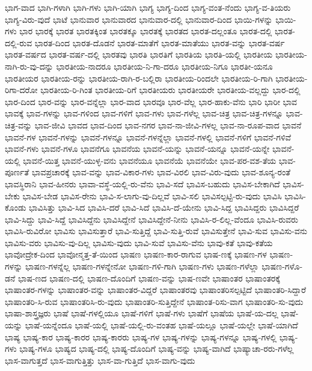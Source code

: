{ಭಾಗ-ವಾದ
ಭಾಗಿ-ಗಳಾಗಿ
ಭಾಗಿ-ಗಳು
ಭಾಗಿ-ಯಾಗಿ
ಭಾಗ್ಯ
ಭಾಗ್ಯ-ದಿಂದ
ಭಾಗ್ಯ-ವಂತ-ನೆಂದು
ಭಾಗ್ಯ-ವ-ತಿಯರು
ಭಾಗ್ಯ-ವಿರು-ವುದೆ
ಭಾಟೆ
ಭಾನುವಾರ
ಭಾನುವಾರದ
ಭಾನುವಾರ-ದಲ್ಲಿ
ಭಾನುವಾರ-ದಿಂದ
ಭಾಯಿ-ಗಳನ್ನು
ಭಾಯಿ-ಗಳು
ಭಾರ
ಭಾರಕ್ಕೆ
ಭಾರತ
ಭಾರತಕ್ಕಿಂತ
ಭಾರತಕ್ಕೂ
ಭಾರತಕ್ಕೆ
ಭಾರತದ
ಭಾರತ-ದಲ್ಲಂತೂ
ಭಾರತ-ದಲ್ಲಿ
ಭಾರತ-ದಲ್ಲಿ-ರುವ
ಭಾರತ-ದಿಂದ
ಭಾರತ-ದೊಡನೆ
ಭಾರತ-ಮಾತೆಗೆ
ಭಾರತ-ಮಾತೆಯು
ಭಾರತ-ವನ್ನು
ಭಾರತ-ವರ್ಷ
ಭಾರತ-ವರ್ಷದ
ಭಾರತ-ವರ್ಷ-ದಲ್ಲಿ
ಭಾರತವು
ಭಾರತಿ
ಭಾರತಿಗೆ
ಭಾರತಿಯ
ಭಾರತಿ-ಯಲ್ಲಿ
ಭಾರತೀಯ
ಭಾರತೀಯ-ನಾಗಿ-ರು-ವು-ದನ್ನು
ಭಾರತೀಯ-ನಾದರೂ
ಭಾರತೀಯ-ನಿ-ಗಾ-ದರೂ
ಭಾರತೀಯ-ನಿಗೂ
ಭಾರತೀ-ಯನೂ
ಭಾರತೀಯರ
ಭಾರತೀಯ-ರನ್ನು
ಭಾರತೀಯ-ರಾಗಿ-ರ-ಬಲ್ಲಿರಾ
ಭಾರತೀಯ-ರಿಂದಲೇ
ಭಾರತೀಯ-ರಿ-ಗಾಗಿ
ಭಾರತೀಯ-ರಿಗಾ-ದರೋ
ಭಾರತೀಯ-ರಿ-ಗಿಂತ
ಭಾರತೀಯ-ರಿಗೆ
ಭಾರತೀಯರು
ಭಾರತೀಯರೇ
ಭಾರತೀಯ-ವಲ್ಲದ್ದು
ಭಾರ-ದಲ್ಲಿ
ಭಾರ-ದಿಂದ
ಭಾರ-ವನ್ನು
ಭಾರ-ವನ್ನೆಲ್ಲಾ
ಭಾರ-ವಾದ
ಭಾರವೂ
ಭಾರ-ವೆಲ್ಲ
ಭಾರ-ಹಾಕು-ವೆನು
ಭಾರಿ
ಭಾರೀ
ಭಾವ
ಭಾವಕ್ಕೆ
ಭಾವ-ಗಳನ್ನು
ಭಾವ-ಗಳಿಂದ
ಭಾವ-ಗಳಿಗೆ
ಭಾವ-ಗಳು
ಭಾವ-ಗಳೆಲ್ಲ
ಭಾವ-ಚಿತ್ರ
ಭಾವ-ಚಿತ್ರ-ಗಳನ್ನೂ
ಭಾವ-ಚಿತ್ರ-ವನ್ನು
ಭಾವ-ಜೀವಿ
ಭಾವದ
ಭಾವ-ದಿಂದ
ಭಾವ-ನಗರ
ಭಾವ-ನಾ-ಜೀವಿ-ಗಳಲ್ಲ
ಭಾವ-ನಾ-ರೂಪ-ವಾದ
ಭಾವನೆ
ಭಾವನೆ-ಗಳ
ಭಾವನೆ-ಗಳನ್ನು
ಭಾವನೆ-ಗಳನ್ನೂ
ಭಾವನೆ-ಗಳನ್ನೆಲ್ಲಾ
ಭಾವನೆ-ಗಳಲ್ಲಿ
ಭಾವನೆ-ಗಳಿಗೆ
ಭಾವನೆ-ಗಳಿವೆ
ಭಾವನೆ-ಗಳು
ಭಾವನೆ-ಗಳೂ
ಭಾವನೆಗೂ
ಭಾವನೆಯ
ಭಾವನೆ-ಯನ್ನು
ಭಾವನೆ-ಯನ್ನೂ
ಭಾವನೆ-ಯನ್ನೇ
ಭಾವನೆ-ಯಲ್ಲಿ
ಭಾವನೆ-ಯಿತ್ತ
ಭಾವನೆ-ಯುಳ್ಳ-ವನು
ಭಾವನೆಯೂ
ಭಾವನೆಯೆ
ಭಾವನೆಯೇ
ಭಾವ-ಪರ-ವಶ-ತೆಯ
ಭಾವ-ಪೂರ್ಣತೆ
ಭಾವಪ್ರಚಾರಕ್ಕೆ
ಭಾವ-ವನ್ನು
ಭಾವ-ವಿಕಾರ-ಗಳು
ಭಾವ-ವಿರಲಿ
ಭಾವ-ವಿರು-ವುದು
ಭಾವ-ಶೂನ್ಯ-ರಂತೆ
ಭಾವಸ್ಥಿರಾನಿ
ಭಾವ-ಹೀನರು
ಭಾವಾ-ವಸ್ಥೆ-ಯಲ್ಲಿ-ರು-ವೆನು
ಭಾವಿ-ಸದೆ
ಭಾವಿಸ-ಬಹುದು
ಭಾವಿಸ-ಬೇಕಾಗಿದೆ
ಭಾವಿಸ-ಬೇಕು
ಭಾವಿಸ-ಬೇಡ
ಭಾವಿಸ-ರೇನು
ಭಾವಿ-ಸ-ಲಾಗು-ವು-ದಿಲ್ಲವೆ
ಭಾವಿ-ಸಲಿ
ಭಾವಿಸಲ್ಪಟ್ಟಿ-ರು-ವುದು
ಭಾವಿಸಿ
ಭಾವಿಸಿ-ಕೊಂಡು
ಭಾವಿಸಿತ್ತು
ಭಾವಿ-ಸಿದ
ಭಾವಿಸಿ-ದರೆ
ಭಾವಿ-ಸಿದೆ
ಭಾವಿಸಿ-ದೆ-ಯೇನು
ಭಾವಿ-ಸಿದ್ದ
ಭಾವಿಸಿದ್ದರು
ಭಾವಿಸಿದ್ದರೆ
ಭಾವಿ-ಸಿದ್ದು
ಭಾವಿ-ಸಿದ್ದೆ
ಭಾವಿಸಿದ್ದೆನು
ಭಾವಿಸಿದ್ದೇನೆ
ಭಾವಿಸಿದ್ದೇನೆ-ನೀನು
ಭಾವಿಸಿ-ರ-ಲಿಲ್ಲ-ವೆಂದೂ
ಭಾವಿಸಿ-ರುವರು
ಭಾವಿಸಿ-ರುವಿರೋ
ಭಾವಿಸು
ಭಾವಿಸುತ್ತಾರೆ
ಭಾವಿ-ಸುತ್ತಿದ್ದೆ
ಭಾವಿ-ಸುತ್ತಿ-ರುವೆ
ಭಾವಿಸುತ್ತೇನೆ
ಭಾವಿ-ಸುವ
ಭಾವಿಸು-ವನು
ಭಾವಿಸು-ವರು
ಭಾವಿಸು-ವು-ದಿಲ್ಲ
ಭಾವಿಸು-ವುದು
ಭಾವಿ-ಸುವೆ
ಭಾವಿಸು-ವೆನು
ಭಾವು-ಕತೆ
ಭಾವು-ಕತೆಯ
ಭಾವೋದ್ರೇಕ-ದಿಂದ
ಭಾವೋನ್ಮತ್ತ-ತೆ-ಯಿಂದ
ಭಾಷಣ
ಭಾಷಣ-ಕಾರ-ರಾಗುವ
ಭಾಷ-ಣಕ್ಕೆ
ಭಾಷಣ-ಗಳ
ಭಾಷಣ-ಗಳನ್ನು
ಭಾಷಣ-ಗಳನ್ನೆಲ್ಲ
ಭಾಷಣ-ಗಳನ್ನೇನೋ
ಭಾಷಣ-ಗಳಿ-ಗಾಗಿ
ಭಾಷಣ-ಗಳು
ಭಾಷಣ-ಗಳೆಲ್ಲಾ
ಭಾಷಣ-ಗಳೊ-ಡನೆ
ಭಾಷ-ಣದ
ಭಾಷಣ-ದಲ್ಲಿ
ಭಾಷಣ-ದೊಂದಿಗೆ
ಭಾಷಣ-ವನ್ನು
ಭಾಷ-ಣವೇ
ಭಾಷಾಂತರ
ಭಾಷಾಂತರಕ್ಕೆ
ಭಾಷಾಂತರ-ಗಳನ್ನು
ಭಾಷಾಂತರ-ವನ್ನು
ಭಾಷಾಂತರ-ವಿದ್ದರೆ
ಭಾಷಾಂತರವು
ಭಾಷಾಂತರಿಸಲ್ಪಟ್ಟಿದೆ
ಭಾಷಾಂತರಿ-ಸಿದ್ದಾರೆ
ಭಾಷಾಂತರಿ-ಸಿ-ರುವ
ಭಾಷಾಂತರಿಸಿ-ರು-ವುದು
ಭಾಷಾಂತರಿ-ಸುತ್ತಿದ್ದೇನೆ
ಭಾಷಾಂತ-ರಿಸು-ವಾಗ
ಭಾಷಾಂತರಿ-ಸು-ವುದು
ಭಾಷಾ-ಶಾಸ್ತ್ರಜ್ಞರು
ಭಾಷೆ
ಭಾಷೆ-ಗಳಲ್ಲಿಯೂ
ಭಾಷೆ-ಗಳಿಗೆ
ಭಾಷೆ-ಗಳು
ಭಾಷೆಗೆ
ಭಾಷೆಯ
ಭಾಷೆ-ಯ-ದಲ್ಲ
ಭಾಷೆ-ಯನ್ನು
ಭಾಷೆ-ಯನ್ನೆಂದೂ
ಭಾಷೆ-ಯಲ್ಲಿ
ಭಾಷೆ-ಯಲ್ಲಿ-ರು-ವಂತಹ
ಭಾಷೆ-ಯಲ್ಲೂ
ಭಾಷೆ-ಯಲ್ಲೇ
ಭಾಷೆ-ಯಾಗಿದೆ
ಭಾಷ್ಯ
ಭಾಷ್ಯ-ಕಾರ
ಭಾಷ್ಯ-ಕಾರರ
ಭಾಷ್ಯ-ಕಾರರು
ಭಾಷ್ಯ-ಗಳ
ಭಾಷ್ಯ-ಗಳನ್ನು
ಭಾಷ್ಯ-ಗಳನ್ನೂ
ಭಾಷ್ಯ-ಗಳಲ್ಲಿ
ಭಾಷ್ಯ-ಗಳು
ಭಾಷ್ಯ-ಗಳೂ
ಭಾಷ್ಯದ
ಭಾಷ್ಯ-ದಲ್ಲಿ
ಭಾಷ್ಯ-ದೊಂದಿಗೆ
ಭಾಷ್ಯ-ವನ್ನು
ಭಾಷ್ಯ-ವಾಗಿದೆ
ಭಾಷ್ಯಾಚಾ-ರರು-ಗಳೆಲ್ಲ
ಭಾಸ-ವಾಗುತ್ತದೆ
ಭಾಸ-ವಾಗುತ್ತಿತ್ತು
ಭಾಸ-ವಾ-ಗುತ್ತಿದೆ
ಭಾಸ-ವಾಗು-ವುದು
}
